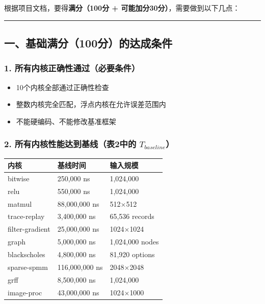 \documentclass[11pt, a4paper]{article}
\begin{document}
\begin{aibox}
根据项目文档，要得\textbf{满分（100分 + 可能加分30分）}，需要做到以下几点：

\begin{center}\rule{\textwidth}{0.4pt}\end{center}

\subsection*{一、基础满分（100分）的达成条件}

\subsubsection*{1. 所有内核正确性通过（必要条件）}
\begin{itemize}
    \item 10个内核全部通过正确性检查
    \item 整数内核完全匹配，浮点内核在允许误差范围内
    \item 不能硬编码、不能修改基准框架
\end{itemize}

\subsubsection*{2. 所有内核性能达到基线（表2中的 $T_{baseline}$）}

\vspace{0.5em}
\begin{tabularx}{\textwidth}{@{} l l X @{}}
\toprule
内核 & 基线时间 & 输入规模 \\
\midrule
bitwise & 250,000 ns & 1,024,000 \\
relu & 550,000 ns & 1,024,000 \\
matmul & 88,000,000 ns & 512$\times$512 \\
trace-replay & 3,400,000 ns & 65,536 records \\
filter-gradient & 25,000,000 ns & 1024$\times$1024 \\
graph & 5,000,000 ns & 1,024,000 nodes \\
blackscholes & 4,800,000 ns & 81,920 options \\
sparse-spmm & 116,000,000 ns & 2048$\times$2048 \\
grff & 8,500,000 ns & 1,024,000 \\
image-proc & 43,000,000 ns & 1024$\times$1000 \\
\bottomrule
\end{tabularx}
\vspace{0.5em}


\end{aibox}
\end{document}
